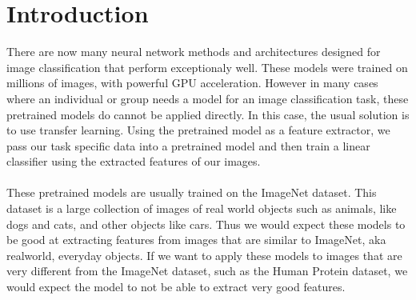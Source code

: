 \documentclass{article}
\begin{document}
\section{Introduction}
There are now many neural network methods and architectures designed for 
image classification that perform exceptionaly well. These models were trained
on millions of images, with powerful GPU acceleration. However in many cases where an individual or group needs a model for an image classification task, these pretrained models do cannot be applied directly. In this case, the usual solution is to use transfer learning. Using the pretrained model as a feature extractor, we pass our task specific data into a pretrained model and then train a linear classifier using the extracted features of our images.
\\
\\
These pretrained models are usually trained on the ImageNet dataset\cite{imagenet_cvpr09}. This dataset is a large
collection of images of real world objects such as animals, like dogs and cats, and other objects like cars.
Thus we would expect these models to be good at extracting features from images that are similar to ImageNet,
aka realworld, everyday objects. If we want to apply these models to images that are very different from 
the ImageNet dataset, such as the Human Protein dataset, we would expect the model to 
not be able to extract very good features.
\end{document}
